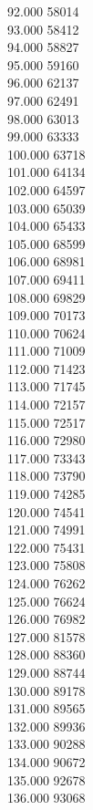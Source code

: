 { 92.000	58014 \\
 93.000	58412 \\
 94.000	58827 \\
 95.000	59160 \\
 96.000	62137 \\
 97.000	62491 \\
 98.000	63013 \\
 99.000	63333 \\
 100.000	63718 \\
 101.000	64134 \\
 102.000	64597 \\
 103.000	65039 \\
 104.000	65433 \\
 105.000	68599 \\
 106.000	68981 \\
 107.000	69411 \\
 108.000	69829 \\
 109.000	70173 \\
 110.000	70624 \\
 111.000	71009 \\
 112.000	71423 \\
 113.000	71745 \\
 114.000	72157 \\
 115.000	72517 \\
 116.000	72980 \\
 117.000	73343 \\
 118.000	73790 \\
 119.000	74285 \\
 120.000	74541 \\
 121.000	74991 \\
 122.000	75431 \\
 123.000	75808 \\
 124.000	76262 \\
 125.000	76624 \\
 126.000	76982 \\
 127.000	81578 \\
 128.000	88360 \\
 129.000	88744 \\
 130.000	89178 \\
 131.000	89565 \\
 132.000	89936 \\
 133.000	90288 \\
 134.000	90672 \\
 135.000	92678 \\
 136.000	93068 \\
}
